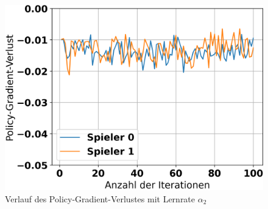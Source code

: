 \begin{figure}[H]
\begin{minipage}[c]{0.32\linewidth}
	\end{minipage}
	\hfill
	\begin{minipage}[c]{0.32\linewidth}
		\includegraphics[width=\linewidth]{Bilder/ensemble-training/c_0_0001/graph_policy_gradient_losses.png}
		\caption{Verlauf des Policy-Gradient-Verlustes mit Lernrate $\alpha_2$}
	\end{minipage}
\end{figure}

